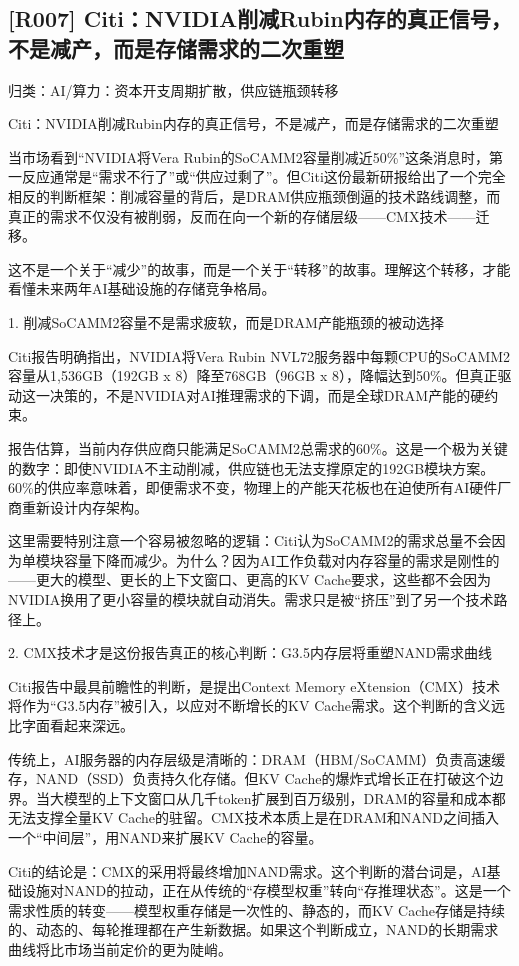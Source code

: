 \documentclass[11pt]{ctexart}
\begin{document}
\subsection{[R007] Citi：NVIDIA削减Rubin内存的真正信号，不是减产，而是存储需求的二次重塑}
{\small\color{refgray}归类：AI/算力：资本开支周期扩散，供应链瓶颈转移}

Citi：NVIDIA削减Rubin内存的真正信号，不是减产，而是存储需求的二次重塑

当市场看到“NVIDIA将Vera Rubin的SoCAMM2容量削减近50\%”这条消息时，第一反应通常是“需求不行了”或“供应过剩了”。但Citi这份最新研报给出了一个完全相反的判断框架：削减容量的背后，是DRAM供应瓶颈倒逼的技术路线调整，而真正的需求不仅没有被削弱，反而在向一个新的存储层级——CMX技术——迁移。

这不是一个关于“减少”的故事，而是一个关于“转移”的故事。理解这个转移，才能看懂未来两年AI基础设施的存储竞争格局。

1. 削减SoCAMM2容量不是需求疲软，而是DRAM产能瓶颈的被动选择

Citi报告明确指出，NVIDIA将Vera Rubin NVL72服务器中每颗CPU的SoCAMM2容量从1,536GB（192GB x 8）降至768GB（96GB x 8），降幅达到50\%。但真正驱动这一决策的，不是NVIDIA对AI推理需求的下调，而是全球DRAM产能的硬约束。

报告估算，当前内存供应商只能满足SoCAMM2总需求的60\%。这是一个极为关键的数字：即使NVIDIA不主动削减，供应链也无法支撑原定的192GB模块方案。60\%的供应率意味着，即便需求不变，物理上的产能天花板也在迫使所有AI硬件厂商重新设计内存架构。

这里需要特别注意一个容易被忽略的逻辑：Citi认为SoCAMM2的需求总量不会因为单模块容量下降而减少。为什么？因为AI工作负载对内存容量的需求是刚性的——更大的模型、更长的上下文窗口、更高的KV Cache要求，这些都不会因为NVIDIA换用了更小容量的模块就自动消失。需求只是被“挤压”到了另一个技术路径上。

2. CMX技术才是这份报告真正的核心判断：G3.5内存层将重塑NAND需求曲线

Citi报告中最具前瞻性的判断，是提出Context Memory eXtension（CMX）技术将作为“G3.5内存”被引入，以应对不断增长的KV Cache需求。这个判断的含义远比字面看起来深远。

传统上，AI服务器的内存层级是清晰的：DRAM（HBM/SoCAMM）负责高速缓存，NAND（SSD）负责持久化存储。但KV Cache的爆炸式增长正在打破这个边界。当大模型的上下文窗口从几千token扩展到百万级别，DRAM的容量和成本都无法支撑全量KV Cache的驻留。CMX技术本质上是在DRAM和NAND之间插入一个“中间层”，用NAND来扩展KV Cache的容量。

Citi的结论是：CMX的采用将最终增加NAND需求。这个判断的潜台词是，AI基础设施对NAND的拉动，正在从传统的“存模型权重”转向“存推理状态”。这是一个需求性质的转变——模型权重存储是一次性的、静态的，而KV Cache存储是持续的、动态的、每轮推理都在产生新数据。如果这个判断成立，NAND的长期需求曲线将比市场当前定价的更为陡峭。
\end{document}
